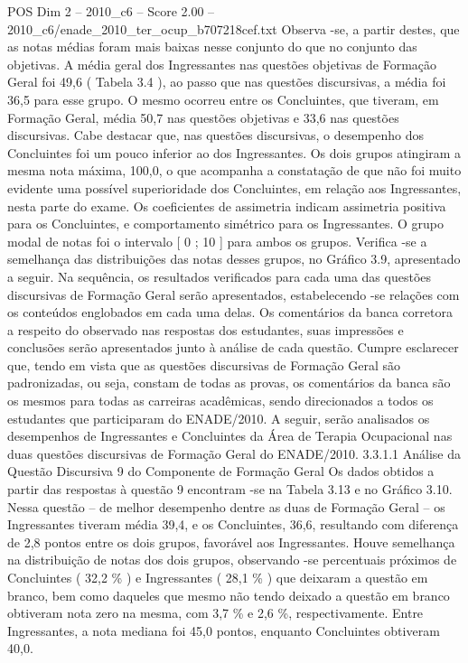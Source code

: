 \begin{textsample}{POS Dim 2 – 2010\_c6 – Score 2.00 – 2010\_c6/enade\_2010\_ter\_ocup\_b707218cef.txt}
Observa -se, a partir destes, que as notas médias foram mais baixas nesse conjunto do que no conjunto das objetivas.
A média geral dos Ingressantes nas questões objetivas de Formação Geral foi 49,6 ( Tabela 3.4 ), ao passo que nas questões discursivas, a média foi 36,5 para esse grupo.
O mesmo ocorreu entre os Concluintes, que tiveram, em Formação Geral, média 50,7 nas questões objetivas e 33,6 nas questões discursivas.
Cabe destacar que, nas questões discursivas, o desempenho dos Concluintes foi um pouco inferior ao dos Ingressantes.
Os dois grupos atingiram a mesma nota máxima, 100,0, o que acompanha a constatação de que não foi muito evidente uma possível superioridade dos Concluintes, em relação aos Ingressantes, nesta parte do exame.
Os coeficientes de assimetria indicam assimetria positiva para os Concluintes, e comportamento simétrico para os Ingressantes.
O grupo modal de notas foi o intervalo [ 0 ; 10 ] para ambos os grupos.
Verifica -se a semelhança das distribuições das notas desses grupos, no Gráfico 3.9, apresentado a seguir.
Na sequência, os resultados verificados para cada uma das questões discursivas de Formação Geral serão apresentados, estabelecendo -se relações com os conteúdos englobados em cada uma delas.
Os comentários da banca corretora a respeito do observado nas respostas dos estudantes, suas impressões e conclusões serão apresentados junto à análise de cada questão.
Cumpre esclarecer que, tendo em vista que as questões discursivas de Formação Geral são padronizadas, ou seja, constam de todas as provas, os comentários da banca são os mesmos para todas as carreiras acadêmicas, sendo direcionados a todos os estudantes que participaram do ENADE/2010.
A seguir, serão analisados os desempenhos de Ingressantes e Concluintes da Área de Terapia Ocupacional nas duas questões discursivas de Formação Geral do ENADE/2010. 3.3.1.1 Análise da Questão Discursiva 9 do Componente de Formação Geral Os dados obtidos a partir das respostas à questão 9 encontram -se na Tabela 3.13 e no Gráfico 3.10.
Nessa questão – de melhor desempenho dentre as duas de Formação Geral – os Ingressantes tiveram média 39,4, e os Concluintes, 36,6, resultando com diferença de 2,8 pontos entre os dois grupos, favorável aos Ingressantes.
Houve semelhança na distribuição de notas dos dois grupos, observando -se percentuais próximos de Concluintes ( 32,2 \% ) e Ingressantes ( 28,1 \% ) que deixaram a questão em branco, bem como daqueles que mesmo não tendo deixado a questão em branco obtiveram nota zero na mesma, com 3,7 \% e 2,6 \%, respectivamente.
Entre Ingressantes, a nota mediana foi 45,0 pontos, enquanto Concluintes obtiveram 40,0.

\end{textsample}
